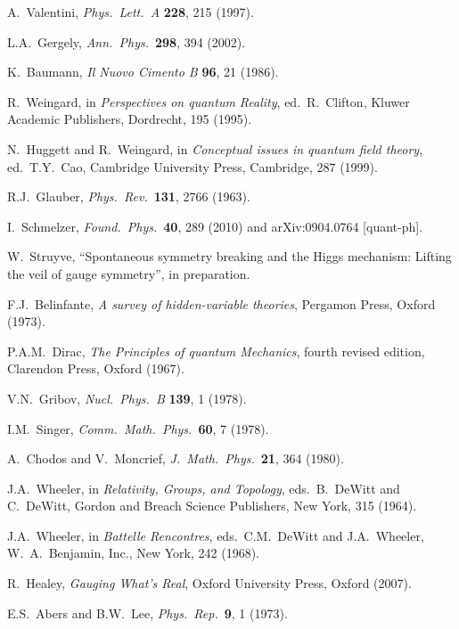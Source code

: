 \documentclass[12pt]{article}
\begin{document}
\begin{thebibliography}{100}
{A.\ Valentini, {\em Phys.\ Lett.\ A} {\bf 228}, 215 (1997).}

{L.A.\ Gergely, {\em Ann.\ Phys.}\ {\bf 298}, 394 (2002).}

{K.\ Baumann, {\em Il Nuovo Cimento B} {\bf 96}, 21 (1986).}

{R.\ Weingard, in {\em Perspectives on quantum Reality}, ed.\ R.\ Clifton,
  Kluwer Academic Publishers, Dordrecht, 195 (1995).}

{N.\ Huggett and R.\ Weingard, in {\em Conceptual issues in quantum field
  theory}, ed.\ T.Y.\ Cao, Cambridge University Press, Cambridge, 287 (1999).}

{R.J.\ Glauber, {\em Phys.\ Rev.}\ {\bf 131}, 2766 (1963).}

{I.\ Schmelzer, {\em Found.\ Phys.}\ {\bf 40}, 289 (2010) and arXiv:0904.0764
  [quant-ph].}

{W.\ Struyve, ``Spontaneous symmetry breaking and the Higgs mechanism: Lifting
  the veil of gauge symmetry'', in preparation.}

{F.J.\ Belinfante, {\em A survey of hidden-variable theories}, Pergamon Press,
  Oxford (1973).}

{P.A.M.\ Dirac, {\em The Principles of quantum Mechanics}, fourth revised
  edition, Clarendon Press, Oxford (1967).}

{V.N.\ Gribov, {\em Nucl.\ Phys.\ B} {\bf 139}, 1 (1978).}

{I.M.\ Singer, {\em Comm.\ Math.\ Phys.}\ {\bf 60}, 7 (1978).}

{A.\ Chodos and V.\ Moncrief, {\em J.\ Math.\ Phys.}\ {\bf 21}, 364 (1980).}

{J.A.\ Wheeler, in {\em Relativity, Groups, and Topology}, eds.\ B.\ DeWitt and
  C.\ DeWitt, Gordon and Breach Science Publishers, New York, 315 (1964).}

{J.A.\ Wheeler, in {\em Battelle Rencontres}, eds.\ C.M.\ DeWitt and J.A.\
  Wheeler, W.\ A.\ Benjamin, Inc., New York, 242 (1968).}

{R.\ Healey, {\em Gauging What's Real}, Oxford University Press, Oxford
  (2007).}

{E.S.\ Abers and B.W.\ Lee, {\em Phys.\ Rep.}\ {\bf 9}, 1 (1973).}


\end{thebibliography}
\end{document}
